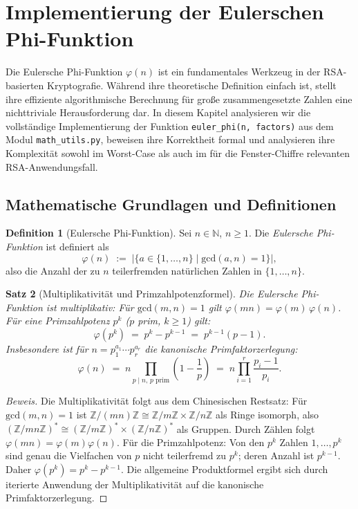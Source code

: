 ﻿\documentclass[12pt, a4paper]{article}
\theoremstyle{plain}
\newtheorem{theorem}{Satz}[section]
\theoremstyle{definition}
\newtheorem{definition}[theorem]{Definition}
\theoremstyle{remark}
\newenvironment{myproof}[1][Beweis]{%
  \begin{proof}[#1]
}{%
  \end{proof}
}
\newcommand{\Z}{\mathbb{Z}}
\newcommand{\N}{\mathbb{N}}
\newcommand{\GCD}{\mathrm{gcd}}
\begin{document}
\section{Implementierung der Eulerschen Phi-Funktion}
\label{sec:euler_phi_impl}

Die Eulersche Phi-Funktion $\varphi(n)$ ist ein fundamentales Werkzeug
in der RSA-basierten Kryptografie. W\"ahrend ihre theoretische Definition
einfach ist, stellt ihre effiziente algorithmische Berechnung f\"ur
gro{\ss}e zusammengesetzte Zahlen eine nichttriviale Herausforderung dar.
In diesem Kapitel analysieren wir die vollst\"andige Implementierung
der Funktion \texttt{euler\_phi(n, factors)} aus dem Modul
\texttt{math\_utils.py}, beweisen ihre Korrektheit formal und analysieren
ihre Komplexit\"at sowohl im Worst-Case als auch im f\"ur die
Fenster-Chiffre relevanten RSA-Anwendungsfall.

\subsection{Mathematische Grundlagen und Definitionen}
\label{subsec:phi_grundlagen}

\begin{definition}[Eulersche Phi-Funktion]\label{def:euler_phi}
  Sei $n \in \N$, $n \ge 1$. Die \emph{Eulersche Phi-Funktion} ist
  definiert als
  \[
    \varphi(n) \;:=\; |\{a \in \{1, \ldots, n\} \mid \GCD(a, n) = 1\}|,
  \]
  also die Anzahl der zu $n$ teilerfremden nat\"urlichen Zahlen in
  $\{1, \ldots, n\}$.
\end{definition}

\begin{theorem}[Multiplikativit\"at und Primzahlpotenzformel]
\label{thm:phi_multiplikativ}
  Die Eulersche Phi-Funktion ist multiplikativ: F\"ur $\GCD(m, n) = 1$
  gilt $\varphi(mn) = \varphi(m)\,\varphi(n)$. F\"ur eine Primzahlpotenz
  $p^k$ ($p$ prim, $k \ge 1$) gilt:
  \[
    \varphi(p^k) \;=\; p^k - p^{k-1} \;=\; p^{k-1}(p-1).
  \]
  Insbesondere ist f\"ur $n = p_1^{a_1} \cdots p_r^{a_r}$ die kanonische
  Primfaktorzerlegung:
  \[
    \varphi(n) \;=\; n \prod_{p \mid n,\, p \text{ prim}}
    \!\left(1 - \frac{1}{p}\right)
    \;=\; n \prod_{i=1}^{r} \frac{p_i - 1}{p_i}.
  \]
\end{theorem}

\begin{myproof}
  Die Multiplikativit\"at folgt aus dem Chinesischen Restsatz:
  F\"ur $\GCD(m,n)=1$ ist $\Z/(mn)\Z \cong \Z/m\Z \times \Z/n\Z$
  als Ringe isomorph, also
  $(\Z/mn\Z)^* \cong (\Z/m\Z)^* \times (\Z/n\Z)^*$ als Gruppen.
  Durch Z\"ahlen folgt $\varphi(mn)=\varphi(m)\varphi(n)$.
  F\"ur die Primzahlpotenz: Von den $p^k$ Zahlen $1,\ldots,p^k$ sind
  genau die Vielfachen von $p$ nicht teilerfremd zu $p^k$; deren Anzahl
  ist $p^{k-1}$. Daher $\varphi(p^k) = p^k - p^{k-1}$.
  Die allgemeine Produktformel ergibt sich durch iterierte Anwendung der
  Multiplikativit\"at auf die kanonische Primfaktorzerlegung.
\end{myproof}
\end{document}
